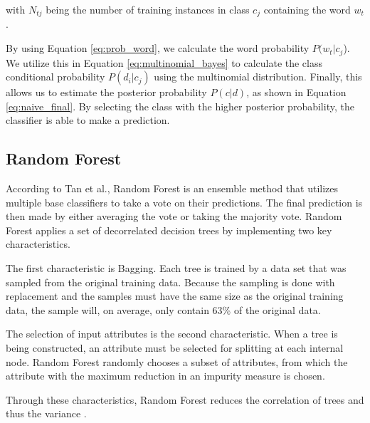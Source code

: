         
        with $N_{tj}$ being the number of training instances in class $c_j$ containing the word $w_t$. 
        
        By using Equation \eqref{eq:prob_word}, we calculate the word probability $P(w_t|c_j$). We utilize this in Equation \eqref{eq:multinomial_bayes} to calculate the class conditional probability $P(d_i|c_j)$ using the multinomial distribution. Finally, this allows us to estimate the posterior probability $P(c|d)$, as shown in Equation \eqref{eq:naive_final}. By selecting the class with the higher posterior probability, the classifier is able to make a prediction.
        
\subsection{Random Forest}
        According to Tan et al., Random Forest is an ensemble method that utilizes multiple base classifiers to take a vote on their predictions. The final prediction is then made by either averaging the vote or taking the majority vote. Random Forest applies a set of decorrelated decision trees by implementing two key characteristics.
        
        The first characteristic is Bagging. Each tree is trained by a data set that was sampled from the original training data. Because the sampling is done with replacement and the samples must have the same size as the original training data, the sample will, on average, only contain 63\% of the original data.
        
        The selection of input attributes is the second characteristic. When a tree is being constructed, an attribute must be selected for splitting at each internal node.
        Random Forest randomly chooses a subset of attributes, from which the attribute with the maximum reduction in an impurity measure is chosen.
        
        Through these characteristics, Random Forest reduces the correlation of trees and thus the variance \cite{DBLP:books/aw/TanSKK2019}.
        
